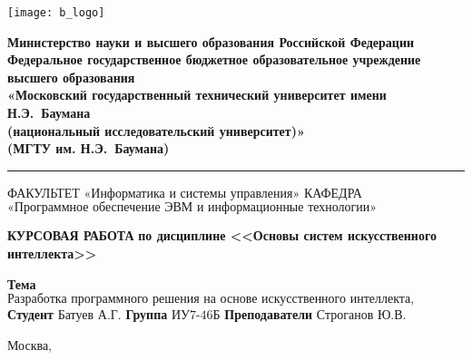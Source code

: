 \thispagestyle{empty}

\noindent \begin{minipage}{0.15\textwidth}
	\texttt{[image: b\_logo]}
\end{minipage}
\noindent\begin{minipage}{0.85\textwidth}\centering
	\textbf{Министерство науки и высшего образования Российской Федерации}\\
	\textbf{Федеральное государственное бюджетное образовательное учреждение высшего образования}\\
	\textbf{«Московский государственный технический университет имени Н.Э.~Баумана}\\
	\textbf{(национальный исследовательский университет)»}\\
	\textbf{(МГТУ им. Н.Э.~Баумана)}
\end{minipage}

\noindent\rule{\linewidth}{3pt}
\newline\newline
\noindent ФАКУЛЬТЕТ $\text{«Информатика и системы управления»}$ \newline\newline
\noindent КАФЕДРА $\text{«Программное обеспечение ЭВМ и информационные технологии»}$

\vspace{1cm}

\begin{center}
	\noindent\begin{minipage}{1\textwidth}
		\centering
		\Large\textbf{КУРСОВАЯ РАБОТА}\newline
		\textbf{по дисциплине <<Основы систем искусственного интеллекта>>}\newline\newline
	\end{minipage}
\end{center}

\noindent\textbf{Тема} $\text{
	Разработка программного решения на основе искусственного интеллекта, 
	способного эффективно определять акторов, действия и временные характеристики их осуществления в текстах с использованием возможностей больших языковых моделей
}$\newline\newline
\noindent\textbf{Студент} $\text{Батуев А.Г.}$\newline\newline
\noindent\textbf{Группа} $\text{ИУ7-46Б}$\newline\newline
\noindent\textbf{Преподаватели} $\text{Строганов Ю.В.}$\newline

\begin{center}
	\vfill
	Москва,~\the\year
\end{center}
\clearpage

